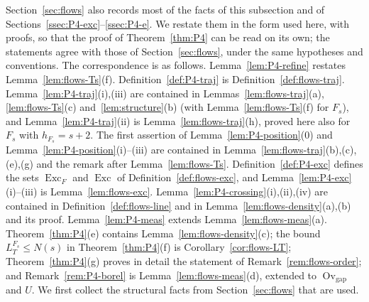 \documentclass[11pt]{amsart}
\newcommand{\Ovgap}{\operatorname{Ov}_{\mathrm{gap}}}
\newcommand{\Exc}{\operatorname{Exc}}
\newcommand{\Fs}{F_{s}}
\theoremstyle{definition}
\theoremstyle{remark}
\numberwithin{equation}{section}
\begin{document}
Section~\ref{sec:flows} also records most of the facts of this subsection and of Sections~\ref{ssec:P4-exc}--\ref{ssec:P4-e}. We restate them in the form used here, with proofs, so that the proof of Theorem~\ref{thm:P4} can be read on its own; the statements agree with those of Section~\ref{sec:flows}, under the same hypotheses and conventions. The correspondence is as follows. Lemma~\ref{lem:P4-refine} restates Lemma~\ref{lem:flows-Ts}(f). Definition~\ref{def:P4-traj} is Definition~\ref{def:flows-traj}. Lemma~\ref{lem:P4-traj}(i),(iii) are contained in Lemmas~\ref{lem:flows-traj}(a), \ref{lem:flows-Ts}(c) and~\ref{lem:structure}(b) (with Lemma~\ref{lem:flows-Ts}(f) for $\Fs$), and Lemma~\ref{lem:P4-traj}(ii) is Lemma~\ref{lem:flows-traj}(h), proved here also for $\Fs$ with $h_{\Fs}=s+2$. The first assertion of Lemma~\ref{lem:P4-position}(0) and Lemma~\ref{lem:P4-position}(i)--(iii) are contained in Lemma~\ref{lem:flows-traj}(b),(c),(e),(g) and the remark after Lemma~\ref{lem:flows-Ts}. Definition~\ref{def:P4-exc} defines the sets $\Exc_F$ and $\Exc$ of Definition~\ref{def:flows-exc}, and Lemma~\ref{lem:P4-exc}(i)--(iii) is Lemma~\ref{lem:flows-exc}. Lemma~\ref{lem:P4-crossing}(i),(ii),(iv) are contained in Definition~\ref{def:flows-line} and in Lemma~\ref{lem:flows-density}(a),(b) and its proof. Lemma~\ref{lem:P4-meas} extends Lemma~\ref{lem:flows-meas}(a). Theorem~\ref{thm:P4}(e) contains Lemma~\ref{lem:flows-density}(c); the bound $L^{\Fs}_T\le N(s)$ in Theorem~\ref{thm:P4}(f) is Corollary~\ref{cor:flows-LT}; Theorem~\ref{thm:P4}(g) proves in detail the statement of Remark~\ref{rem:flows-order}; and Remark~\ref{rem:P4-borel} is Lemma~\ref{lem:flows-meas}(d), extended to $\Ovgap$ and $U$. We first collect the structural facts from Section~\ref{sec:flows} that are used.
\end{document}
